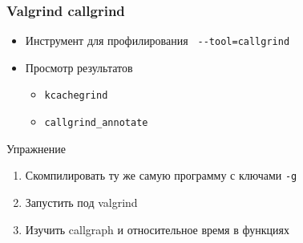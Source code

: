 \begin{frame}[fragile]
 \frametitle{Valgrind callgrind}
 \begin{itemize}
  \item Инструмент для профилирования \verb+ --tool=callgrind+
  \item Просмотр результатов
    \begin{itemize}
      \item \texttt{kcachegrind}
      \item \texttt{callgrind\_annotate}
    \end{itemize}
 \end{itemize}
 \begin{center}
  Упражнение
 \end{center}
 \begin{enumerate}
  \item Скомпилировать ту же самую программу с ключами \verb+-g+
  \item Запустить под valgrind
  \item Изучить callgraph и относительное время в функциях
 \end{enumerate}
\end{frame}
